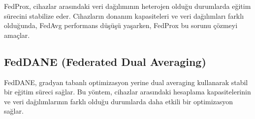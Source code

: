 FedProx, cihazlar arasındaki veri dağılımının heterojen olduğu durumlarda eğitim sürecini stabilize eder. Cihazların donanım kapasiteleri ve veri dağılımları farklı olduğunda, FedAvg performans düşüşü yaşarken, FedProx bu sorunu çözmeyi amaçlar.

\subsection{FedDANE (Federated Dual Averaging)}

FedDANE, gradyan tabanlı optimizasyon yerine dual averaging kullanarak stabil bir eğitim süreci sağlar. Bu yöntem, cihazlar arasındaki hesaplama kapasitelerinin ve veri dağılımlarının farklı olduğu durumlarda daha etkili bir optimizasyon sağlar.

\newpage